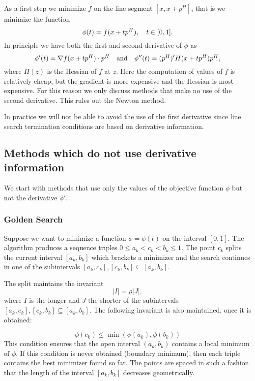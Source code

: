 As a first step we minimize $f$ on the line segment $[x,x+p^H]$, that is we minimize the function
$$
\phi(t)=f(x+tp^H),\quad t\in[0,1].
$$
In principle we have both the first and second derivative of $\phi$ as
$$
\phi'(t)=\nabla f(x+tp^H)\cdot p^H
\quad\text{and}\quad
\phi''(t)=(p^H)'H(x+tp^H)p^H,
$$
where $H(z)$ is the Hessian of $f$ at $z$. Here the computation of values of $f$ is relatively cheap, 
but the gradient is more expensive and the Hessian is most expensive. For this reason we only discuss methods that make no use
of the second derivative. This rules out the Newton method. 

In practice we will not be able to avoid the use of the first derivative since line search termination conditions are based on 
derivative information.  

\subsection{Methods which do not use derivative information}

We start with methods that use only the values of the objective function $\phi$ but not the derivative $\phi'$.

\subsubsection{Golden Search} 
\label{sec:golden_search}

Suppose we want to minimize a function $\phi=\phi(t)$ on the interval $[0,1]$. The algorithm produces a
sequence triples $0\leq a_k<c_k<b_k\leq 1$. The point $c_k$ splits the current interval $[a_k,b_k]$ which
brackets a minimizer and the search continues in one of the subintervals $[a_k,c_k],[c_k,b_k]\subseteq[a_k,b_k]$.

\noindent
The split maintains the invariant
%
\begin{equation}
\label{inv1}
|I|=\rho|J|,
\end{equation}
%  
where $I$ is the longer and $J$ the shorter of the subintervals $[a_k,c_k],[c_k,b_k]\subseteq[a_k,b_k]$.
The following invariant is also maintained, once it is obtained:

%
\begin{equation}
\label{inv2}
\phi(c_k)\leq\min(\phi(a_k),\phi(b_k))
\end{equation}
%  
This condition ensures that the open interval $(a_k,b_k)$ contains a local minimum of $\phi$. If this
condition is never obtained (boundary minimum), then each triple contains the best minimizer found so far.
The points are spaced in such a fashion that the length of the interval $[a_k,b_k]$ decreases geometrically. 

